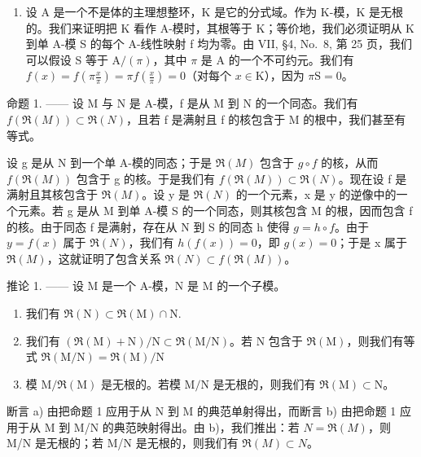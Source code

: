 \begin{enumerate}
\def\labelenumi{\arabic{enumi})}
\setcounter{enumi}{1}
\tightlist
\item
  设 A 是一个不是体的主理想整环，K 是它的分式域。作为 K-模，K 是无根的。我们来证明把 K 看作 A-模时，其根等于 K；等价地，我们必须证明从 K 到单 A-模 S 的每个 A-线性映射 f 均为零。由 VII, §4, No.~8, 第 25 页，我们可以假设 S 等于 \(\mathrm{A}/(\pi)\)，其中 \(\pi\) 是 A 的一个不可约元。我们有 \(f(x) = f\left(\pi \frac{x}{\pi}\right) = \pi f\left(\frac{x}{\pi}\right) = 0\)（对每个 \(x \in \mathrm{K}\)），因为 \(\pi \mathrm{S} = 0\)。
\end{enumerate}

命题 1. —— 设 M 与 N 是 A-模，f 是从 M 到 N 的一个同态。我们有 \(f(\mathfrak{R}(M)) \subset \mathfrak{R}(N)\)，且若 f 是满射且 f 的核包含于 M 的根中，我们甚至有等式。

设 g 是从 N 到一个单 A-模的同态；于是 \(\mathfrak{R}(M)\) 包含于 \(g \circ f\) 的核，从而 \(f(\mathfrak{R}(M))\) 包含于 g 的核。于是我们有 \(f(\mathfrak{R}(M)) \subset \mathfrak{R}(N)\)。现在设 f 是满射且其核包含于 \(\mathfrak{R}(M)\)。设 y 是 \(\mathfrak{R}(N)\) 的一个元素，x 是 y 的逆像中的一个元素。若 g 是从 M 到单 A-模 S 的一个同态，则其核包含 M 的根，因而包含 f 的核。由于同态 f 是满射，存在从 N 到 S 的同态 h 使得 \(g = h \circ f\)。由于 \(y = f(x)\) 属于 \(\mathfrak{R}(N)\)，我们有 \(h(f(x)) = 0\)，即 \(g(x) = 0\)；于是 x 属于 \(\mathfrak{R}(M)\)，这就证明了包含关系 \(\mathfrak{R}(N) \subset f(\mathfrak{R}(M))\)。

推论 1. —— 设 M 是一个 A-模，N 是 M 的一个子模。

\begin{enumerate}
\def\labelenumi{\alph{enumi})}
\item
  我们有 \(\Re (\mathrm{N})\subset \Re (\mathrm{M})\cap \mathrm{N}.\)
\item
  我们有 \((\Re (\mathrm{M}) + \mathrm{N}) / \mathrm{N}\subset \Re (\mathrm{M} / \mathrm{N})\)。若 N 包含于 \(\Re (\mathrm{M})\)，则我们有等式 \(\Re (\mathrm{M} / \mathrm{N}) = \Re (\mathrm{M}) / \mathrm{N}\)
\item
  模 \(\mathrm{M} / \Re (\mathrm{M})\) 是无根的。若模 \(\mathrm{M} / \mathrm{N}\) 是无根的，则我们有 \(\Re (\mathrm{M})\subset \mathrm{N}\)。
\end{enumerate}

断言 a) 由把命题 1 应用于从 N 到 M 的典范单射得出，而断言 b) 由把命题 1 应用于从 M 到 M/N 的典范映射得出。由 b)，我们推出：若 \(N = \Re(M)\)，则 M/N 是无根的；若 M/N 是无根的，则我们有 \(\Re(M) \subset N\)。

